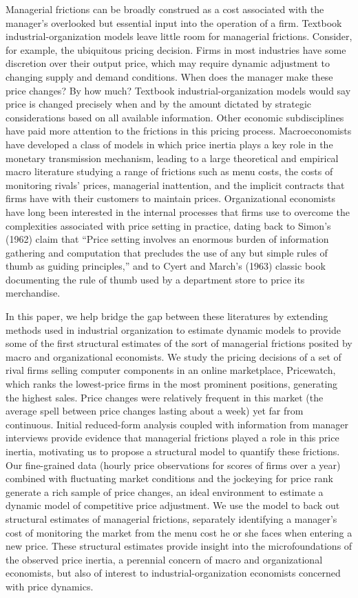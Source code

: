\documentclass[11pt]{article}
\begin{document}
\begin{spacing}{1.3}
Managerial frictions can be broadly construed as a cost associated
with the manager's overlooked but essential input into the operation
of a firm. Textbook industrial-organization models leave little room
for managerial frictions. Consider, for example, the ubiquitous
pricing decision. Firms in most industries have some discretion over
their output price, which may require dynamic adjustment to changing
supply and demand conditions. When does the manager make these price
changes? By how much? Textbook industrial-organization models would
say price is changed precisely when and by the amount dictated by
strategic considerations based on all available information. Other
economic subdisciplines have paid more attention to the frictions in
this pricing process. Macroeconomists have developed a class of models
in which price inertia plays a key role in the monetary transmission
mechanism, leading to a large theoretical and empirical macro
literature studying a range of frictions such as menu costs, the costs
of monitoring rivals' prices, managerial inattention, and the implicit
contracts that firms have with their customers to maintain prices.
Organizational economists have long been interested in the internal
processes that firms use to overcome the complexities associated with
price setting in practice, dating back to Simon's (1962) claim that
``Price setting involves an enormous burden of information gathering
and computation that precludes the use of any but simple rules of
thumb as guiding principles,'' and to Cyert and March's (1963) classic
book documenting the rule of thumb used by a department store to price
its merchandise.

In this paper, we help bridge the gap between these literatures by
extending methods used in industrial organization to estimate dynamic
models to provide some of the first structural estimates of the sort
of managerial frictions posited by macro and organizational
economists.  We study the pricing decisions of a set of rival firms
selling computer components in an online marketplace, Pricewatch,
which ranks the lowest-price firms in the most prominent positions,
generating the highest sales. Price changes were relatively frequent
in this market (the average spell between price changes lasting about
a week) yet far from continuous.  Initial reduced-form analysis
coupled with information from manager interviews provide evidence that
managerial frictions played a role in this price inertia, motivating
us to propose a structural model to quantify these frictions.  Our
fine-grained data (hourly price observations for scores of firms over
a year) combined with fluctuating market conditions and the jockeying
for price rank generate a rich sample of price changes, an ideal
environment to estimate a dynamic model of competitive price
adjustment. We use the model to back out structural estimates of
managerial frictions, separately identifying a manager's cost of
monitoring the market from the menu cost he or she faces when entering
a new price. These structural estimates provide insight into the
microfoundations of the observed price inertia, a perennial concern of
macro and organizational economists, but also of interest to
industrial-organization economists concerned with price dynamics.


\end{spacing}
\end{document}

